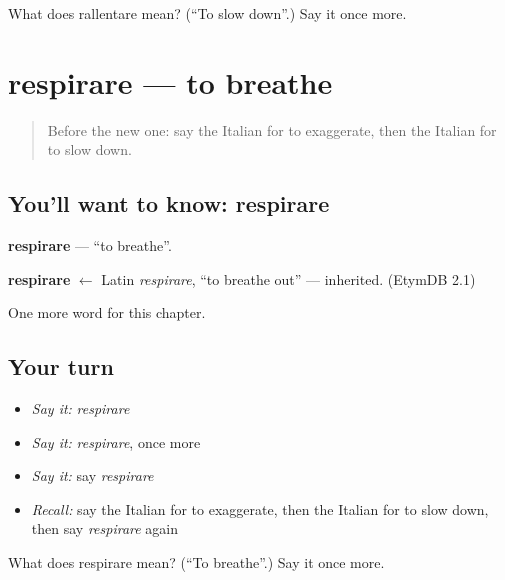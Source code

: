 \begin{tcolorbox}[breakable,colback=teal!4,colframe=teal!35!black,title={Before you move on}]
What does rallentare mean? (\textquotedblleft{}To slow down\textquotedblright{}.) Say it once more.
\end{tcolorbox}
\section[respirare]{respirare — to breathe}

\label{lesson:IT-C242-respirare}



\begin{quote}
Before the new one: say the Italian for to exaggerate, then the Italian for to slow down.
\end{quote}

\subsection*{You'll want to know: respirare}
\textbf{respirare} — \textquotedblleft{}to breathe\textquotedblright{}.

\begin{cousinweb}
\textbf{respirare} $\leftarrow$ Latin \emph{respirare}, \textquotedblleft{}to breathe out\textquotedblright{} — inherited. (EtymDB 2.1)
\end{cousinweb}

\begin{grammarlens}[title={What you've built}]
One more word for this chapter.
\end{grammarlens}

\subsection*{Your turn}
\begin{itemize}
\raggedright
  \item \emph{Say it:} \emph{respirare}
  \item \emph{Say it:} \emph{respirare}, once more
  \item \emph{Say it:} say \emph{respirare}
  \item \emph{Recall:} say the Italian for to exaggerate, then the Italian for to slow down, then say \emph{respirare} again
\end{itemize}

\begin{tcolorbox}[breakable,colback=teal!4,colframe=teal!35!black,title={Before you move on}]
What does respirare mean? (\textquotedblleft{}To breathe\textquotedblright{}.) Say it once more.
\end{tcolorbox}
